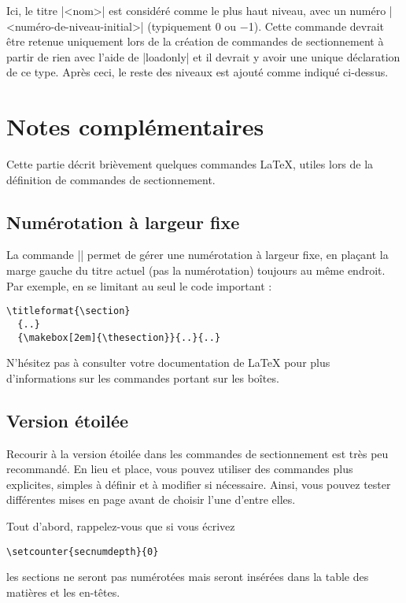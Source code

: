 \documentclass[a4paper]{ltxguide}
\begin{document}
Ici, le titre |<nom>| est considéré comme le plus haut niveau, avec un
numéro |<numéro-de-niveau-initial>| (typiquement 0 ou $-$1). Cette commande
devrait être retenue uniquement lors de la création de commandes de 
sectionnement à partir de rien avec l'aide de |loadonly| et il devrait y avoir
une unique déclaration de ce type. Après ceci, le reste des niveaux est ajouté
comme indiqué ci-dessus.

\section{Notes complémentaires}

Cette partie décrit brièvement quelques commandes \LaTeX{}, utiles lors de la
définition de commandes de sectionnement.

\subsection{Numérotation à largeur fixe}

La commande |\makebox| permet de gérer une numérotation à largeur fixe, en
plaçant la marge gauche du titre actuel (pas la numérotation) toujours au même
endroit. Par exemple, en se limitant au seul le code important :
\begin{verbatim}
\titleformat{\section}
  {..}
  {\makebox[2em]{\thesection}}{..}{..}
\end{verbatim}

N'hésitez pas à consulter votre documentation de \LaTeX{} pour plus
d'informations sur les commandes portant sur les boîtes.

\subsection{Version étoilée} \label{s:starred}


Recourir à la version étoilée dans les commandes de sectionnement est très 
peu recommandé. En lieu et place, vous pouvez utiliser des commandes plus
explicites, simples à définir et à modifier si nécessaire. Ainsi, vous pouvez
tester différentes mises en page avant de choisir l'une d'entre elles.

Tout d'abord, rappelez-vous que si vous écrivez
\begin{verbatim}
\setcounter{secnumdepth}{0}
\end{verbatim}
les sections ne seront pas numérotées mais seront insérées dans la table des
matières et les en-têtes.
\end{document}
